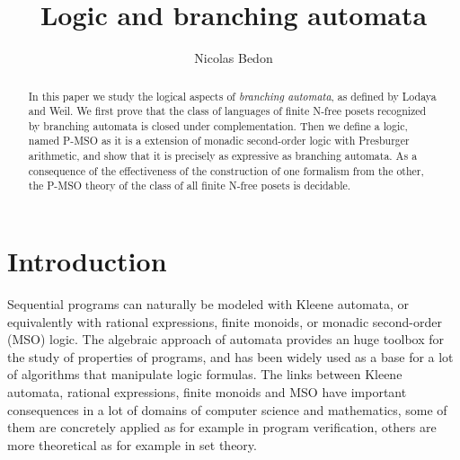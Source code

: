 \documentclass{CSML}
\title[Logic and branching automata]{Logic and branching automata\rsuper*}
\author[N.~Bedon]{Nicolas Bedon}
\begin{document}
\begin{abstract}
In this paper we study the logical aspects of \emph{branching automata}, as defined by Lodaya and Weil.
We first prove that the class of languages of finite N-free posets recognized by branching automata is closed under complementation.
Then we define a logic, named P-MSO as it is a extension of monadic second-order logic with Presburger arithmetic, and show that it is precisely as expressive as branching automata.
As a consequence of the effectiveness of the construction of one formalism from the other, the P-MSO theory of the class of all finite N-free posets is decidable. 
\end{abstract}

\maketitle

\section{Introduction}
\label{sec:intro}

Sequential programs can naturally be modeled with Kleene automata, or equivalently with rational expressions, finite monoids, or monadic second-order (MSO) logic.
The algebraic approach of automata provides an huge toolbox for the study of properties of programs, and has been widely used as a base for a lot of algorithms that manipulate logic formulas. The links between Kleene automata, rational expressions, finite monoids and MSO have important consequences in a lot of domains of computer science and mathematics, some of them are concretely applied as for example in program verification, others are more theoretical as for example in set theory.
\end{document}
